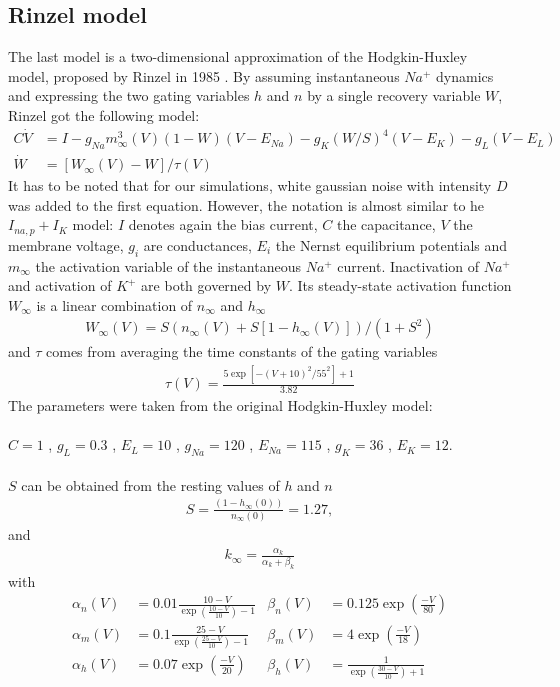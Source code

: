 \documentclass[12pt,a4paper]{article}
\begin{document}
\subsection{Rinzel model}
The last model is a two-dimensional approximation of the Hodgkin-Huxley model, proposed by Rinzel in 1985 \cite{rinzel}. By assuming instantaneous $Na^+$ dynamics and expressing the two gating variables $h$ and $n$ by a single recovery variable $W$, Rinzel got the following model:
\begin{align*}
C\dot{V}&=I-g_{Na}m_\infty^3(V)(1-W)(V-E_{Na})-g_K(W/S)^4(V-E_K)-g_L(V-E_L)\\
\dot{W}&=\left[W_\infty(V)-W\right]/\tau(V)
\end{align*}
It has to be noted that for our simulations, white gaussian noise with intensity $D$ was added to the first equation.
However, the notation is almost similar to he $I_{na,p}+I_K$ model: $I$ denotes again the bias current, $C$ the capacitance, $V$ the membrane voltage, $g_i$ are conductances, $E_i$ the Nernst equilibrium potentials and $m_{\infty}$ the activation variable of the instantaneous $Na^+$ current. Inactivation of $Na^+$ and activation of $K^+$ are both governed by $W$. Its steady-state activation function $W_\infty$ is a linear combination of $n_\infty$ and $h_\infty$
\begin{align*}
W_\infty(V)=S\left(n_\infty(V)+S\left[1-h_\infty(V)\right]\right)/(1+S^2)\end{align*}
and $\tau$ comes from averaging the time constants of the gating variables
\begin{align*}
\tau(V)=\frac{5\exp[-(V+10)^2/55^2 ]+1}{3.82}
\end{align*}
The parameters were taken from the original Hodgkin-Huxley model:\\\\
$C=1$ , $g_L=0.3$ , $E_L=10$ , $g_{Na}=120$ , $E_{Na}=115$ , $g_K=36$ , $E_K=12$.\\\\
$S$ can be obtained from the resting values of $h$ and $n$
\begin{align*}
S=\frac{(1-h_\infty(0))}{n_\infty(0)}=1.27,
\end{align*}
and
\begin{align*}
k_\infty=\frac{\alpha_k}{\alpha_k+\beta_k}
\end{align*}
with
\begin{align*}
\alpha_n(V)&=0.01\frac{10-V}{\exp\left(\frac{10-V}{10}\right)-1}
&\beta_n(V)&=0.125\exp\left(\frac{-V}{80}\right)\\
\alpha_m(V)&=0.1\frac{25-V}{\exp\left(\frac{25-V}{10}\right)-1}
&\beta_m(V)&=4\exp\left(\frac{-V}{18}\right)\\
\alpha_h(V)&=0.07\exp\left(\frac{-V}{20}\right)
&\beta_h(V)&=\frac{1}{\exp\left(\frac{30-V}{10}\right)+1}
\end{align*}
\end{document}
